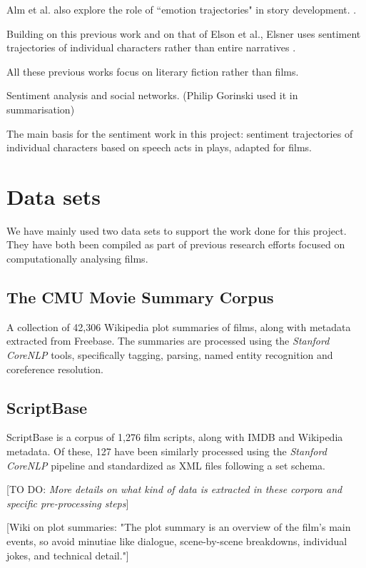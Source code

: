 \documentclass[bsc,frontabs,singlespacing,parskip]{infthesis} %
\begin{document}
Alm et al. also explore the role of ``emotion trajectories" in story development. \cite{alm2005emotional}.

Building on this previous work and on that of Elson et al., Elsner uses sentiment trajectories of individual characters rather than entire narratives \cite{elsner2012character}.

All these previous works focus on literary fiction rather than films.

Sentiment analysis and social networks. (Philip Gorinski used it in summarisation)

The main basis for the sentiment work in this project: \cite{Nalisnick2013} sentiment trajectories of individual characters based on speech acts in plays, adapted for films.



\section{Data sets} \label{sec:data sets}
We have mainly used two data sets to support the work done for this project. They have both been compiled as part of previous research efforts focused on computationally analysing films.

\subsection{The CMU Movie Summary Corpus}
A collection of 42,306 Wikipedia plot summaries of films, along with metadata extracted from Freebase. The summaries are processed using the \textit{Stanford CoreNLP} tools, specifically tagging, parsing, named entity recognition and coreference resolution.

\subsection{ScriptBase}
ScriptBase \cite{Gorinski2015} is a corpus of 1,276 film scripts, along with IMDB and Wikipedia metadata. Of these, 127 have been similarly processed using the \textit{Stanford CoreNLP} pipeline and standardized as XML files following a set schema.

[TO DO: \textit{More details on what kind of data is extracted in these corpora and specific pre-processing steps}]

[Wiki on plot summaries: "The plot summary is an overview of the film's main events, so avoid minutiae like dialogue, scene-by-scene breakdowns, individual jokes, and technical detail."]
\end{document}
